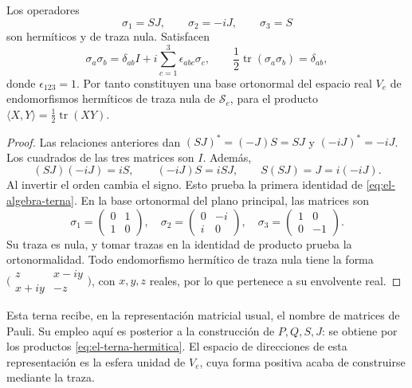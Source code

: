 \begin{proposition}
\label{prop:el-terna-hermitica}
Los operadores
\begin{equation}
 \sigma_1=SJ,\qquad \sigma_2=-iJ,\qquad \sigma_3=S
 \label{eq:el-terna-hermitica}
\end{equation}
son hermíticos y de traza nula. Satisfacen
\begin{equation}
 \sigma_a\sigma_b
 =\delta_{ab}I+i\sum_{c=1}^3\epsilon_{abc}\sigma_c,
 \qquad
 \frac12\operatorname{tr}(\sigma_a\sigma_b)=\delta_{ab},
 \label{eq:el-algebra-terna}
\end{equation}
donde \(\epsilon_{123}=1\). Por tanto constituyen una base ortonormal
del espacio real \(V_e\) de endomorfismos hermíticos de traza nula de
\(\mathscr S_e\), para el producto
\(\langle X,Y\rangle=\frac12\operatorname{tr}(XY)\).
\end{proposition}
\begin{proof}
Las relaciones anteriores dan \((SJ)^*=(-J)S=SJ\) y
\((-iJ)^*=-iJ\). Los cuadrados de las tres matrices son \(I\).
Además,
\[
 (SJ)(-iJ)=iS,\qquad (-iJ)S=iSJ,\qquad S(SJ)=J=i(-iJ).
\]
Al invertir el orden cambia el signo. Esto prueba la primera identidad
de \eqref{eq:el-algebra-terna}. En la base ortonormal del plano principal,
las matrices son
\[
 \sigma_1=\begin{pmatrix}0&1\\1&0\end{pmatrix},\quad
 \sigma_2=\begin{pmatrix}0&-i\\i&0\end{pmatrix},\quad
 \sigma_3=\begin{pmatrix}1&0\\0&-1\end{pmatrix}.
\]
Su traza es nula, y tomar trazas en la identidad de producto prueba la
ortonormalidad. Todo endomorfismo hermítico de traza nula tiene la forma
\(\bigl(\begin{smallmatrix}z&x-iy\\x+iy&-z\end{smallmatrix}\bigr)\),
con \(x,y,z\) reales, por lo que pertenece a su envolvente real.
\end{proof}

Esta terna recibe, en la representación matricial usual, el nombre de
matrices de Pauli. Su empleo aquí es posterior a la construcción de
\(P,Q,S,J\): se obtiene por los productos
\eqref{eq:el-terna-hermitica}. El espacio de direcciones de esta
representación es la esfera unidad de \(V_e\), cuya forma positiva
acaba de construirse mediante la traza.

